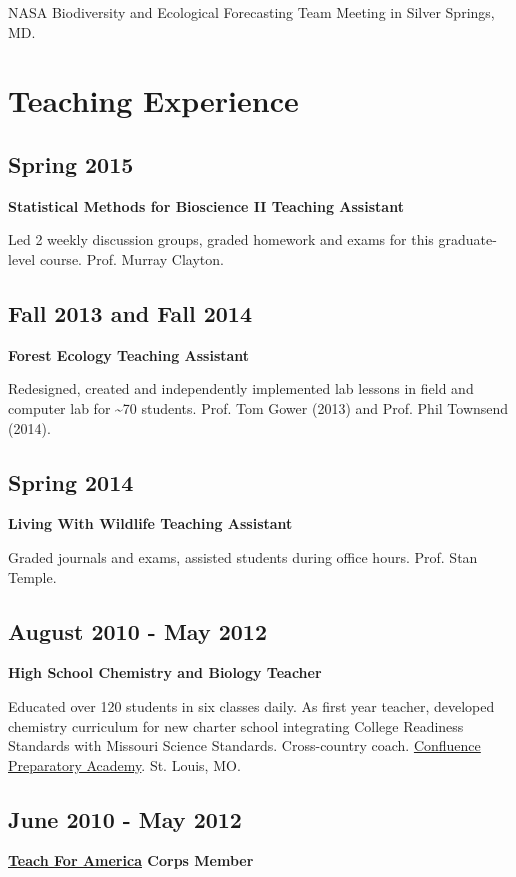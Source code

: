 \documentclass{article}
\begin{document}
NASA Biodiversity and Ecological Forecasting Team Meeting in Silver Springs, MD.
\section*{Teaching Experience}
\label{sec:org9705828}
\subsection*{Spring 2015}
\label{sec:org451ee49}
\textbf{Statistical Methods for Bioscience II Teaching Assistant}

Led 2 weekly discussion groups, graded homework and exams for this
graduate-level course. Prof. Murray Clayton.

\subsection*{Fall 2013 and Fall 2014}
\label{sec:org2679fb2}
\textbf{Forest Ecology Teaching Assistant}

Redesigned, created and independently implemented lab lessons in field and computer lab for \textasciitilde{}70
students.  Prof. Tom Gower (2013) and Prof. Phil Townsend (2014).

\subsection*{Spring 2014}
\label{sec:orgdb80224}
\textbf{Living With Wildlife Teaching Assistant}

Graded journals and exams, assisted students during office hours.
Prof. Stan Temple.

\subsection*{August 2010 - May 2012}
\label{sec:org389d8cb}
\textbf{High School Chemistry and Biology Teacher}

Educated over 120 students in six classes daily. As first year
teacher, developed chemistry curriculum for new charter school
integrating College Readiness Standards with Missouri Science
Standards. Cross-country coach. \href{https://www.google.com/search?q=Confluence+Preparatory+Academy+St.+Louis\&oq=Confluence+Prep+Academy+St.+Louis\&aqs=chrome..69i57.7294j0j8\&sourceid=chrome\&ie=UTF-8\#q=Confluence+Prep+Academy+High+School+St.+Louis}{Confluence Preparatory Academy}. St. Louis, MO.

\subsection*{June 2010 - May 2012}
\label{sec:org565900d}
\textbf{\href{https://www.teachforamerica.org/}{Teach For America} Corps Member}
\end{document}
